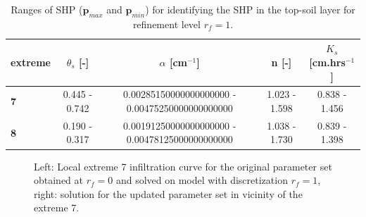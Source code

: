 \documentclass[review,times,3p,10pt]{elsarticle}
\renewcommand{\vec}{\mathbf}
\newcommand{\fs}{\footnotesize}
\begin{document}
\begin{table}[ht]
\begin{center}
\caption{Ranges of SHP ($\vec{p}_{max}$ and $\vec{p}_{min}$) for identifying the SHP in the top-soil layer for { refinement level} $r_f=1$. }
\fs
\begin{tabular}{ l || c | c| c| c }
\toprule
extreme & $\theta_s$ [-]&$\alpha$ [cm$^{-1}$]&n [-]& $K_s$ [cm.hrs$^{-1}$]   \\ \hline
\toprule
{\bf 7} & 0.445 - 0.742 & \num{.00285150000000000000} - \num{.00475250000000000000} & 1.023 - 1.598 & 0.838 - 1.456 \\
{\bf 8} & 0.190 - 0.317 & \num{.00191250000000000000} - \num{.00478125000000000000} & 1.038 - 1.730 & 0.839 - 1.398  \\
\toprule
\end{tabular}
\label{rozsahy2}
\end{center}
\end{table}



\begin{figure}
\caption{Left: Local extreme 7 infiltration curve for the original parameter set obtained at $r_f=0$ and solved on model with discretization $r_f=1$, right: solution for the updated parameter set in  vicinity of the extreme 7.}
\label{rf1examples}
\end{figure}
\end{document}
